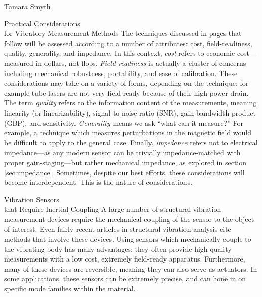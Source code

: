 \documentclass[a4paper,10pt]{report}
\numberwithin{equation}{section}
\begin{document}
\begin{chapter}{Tamara Smyth}
\begin{section}{Practical Considerations\\ for Vibratory Measurement Methods}
The techniques discussed in pages that follow will be assessed according to a number of attributes: cost, field-readiness, quality, generality, and impedance. In this context, \emph{cost} refers to economic cost---measured in dollars, not flops. \emph{Field-readiness} is actually a cluster of concerns including mechanical robustness, portability, and ease of calibration. These considerations may take on a variety of forms, depending on the technique: for example tube lasers are not very field-ready because of their high power drain. The term \emph{quality} refers to the information content of the measurements, meaning linearity (or linearizability), signal-to-noise ratio (SNR), gain-bandwidth-product (GBP), and sensitivity. \emph{Generality} means we ask ``what can it measure?'' For example, a technique which measures perturbations in the magnetic field would be difficult to apply to the general case. Finally, \emph{impedance} refers not to electrical impedance---as any modern sensor can be trivially 
impedance-matched with proper gain-staging---but rather mechanical impedance, as explored in section \ref{sec:impedance}. Sometimes, despite our best efforts, these considerations will become interdependent. This is the nature of considerations.
\end{section}
\begin{section}{Vibration Sensors \\that Require Inertial Coupling}\label{sec:coupling}
 A large number of structural vibration measurement devices require the mechanical coupling of the sensor to the object of interest. Even fairly recent articles in structural vibration analysis cite methods that involve these devices. \cite{Han2003} \cite{Kerschen2002} Using sensors which mechanically couple to the vibrating body has many advantages: they often provide high quality measurements with a low cost, extremely field-ready apparatus. Furthermore, many of these devices are reversible, meaning they can also serve as actuators. \cite[p.~69]{Cremer1973} In some applications, these sensors can be extremely precise, and can hone in on specific mode families within the material. \cite[p.~36]{Ballantine1997}


\end{section}
\end{chapter}
\end{document}
